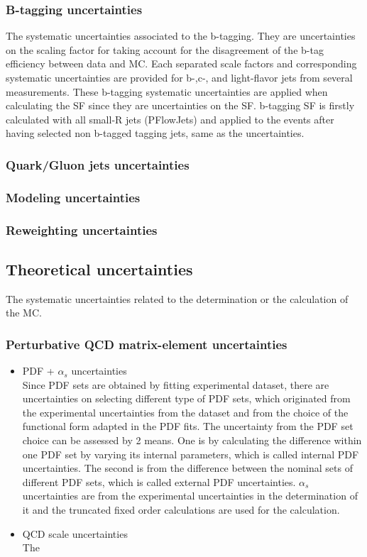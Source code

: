 \begin{table}[!hp]
\begin{center}
  \clearpage

\subsubsection{B-tagging uncertainties}
The systematic uncertainties associated to the b-tagging.
They are uncertainties on the scaling factor for taking account for the disagreement of the b-tag efficiency between data and MC. Each separated scale factors and corresponding systematic uncertainties are provided for b-,c-, and light-flavor jets from several measurements.
These b-tagging systematic uncertainties are applied when calculating the SF since they are uncertainties on the SF. b-tagging SF is firstly calculated with all small-R jets (PFlowJets) and applied to the events after having selected non b-tagged tagging jets, same as the uncertainties. 

\subsubsection{Quark/Gluon jets uncertainties}
\subsubsection{Modeling uncertainties}
\subsubsection{Reweighting uncertainties}
\subsection{Theoretical uncertainties}
The systematic uncertainties related to the determination or the calculation of the MC.
\subsubsection{Perturbative QCD matrix-element uncertainties}
\begin{itemize}
      \item PDF + $\alpha_s$ uncertainties\\
      Since PDF sets are obtained by fitting experimental dataset, there are uncertainties on selecting different type of PDF sets, which originated from the experimental uncertainties from the dataset and from the choice of the functional form adapted in the PDF fits.
      The uncertainty from the PDF set choice can be assessed by 2 means. One is by calculating the difference within one PDF set by varying its internal parameters, which is called internal PDF uncertainties. The second is from the difference between the nominal sets of different PDF sets, which is called external PDF uncertainties.
      $\alpha_s$ uncertainties are from the experimental uncertainties in the determination of it and the truncated fixed order calculations are used for the calculation.
      \item QCD scale uncertainties\\
      The 

\end{itemize}
\end{center}
\end{table}

